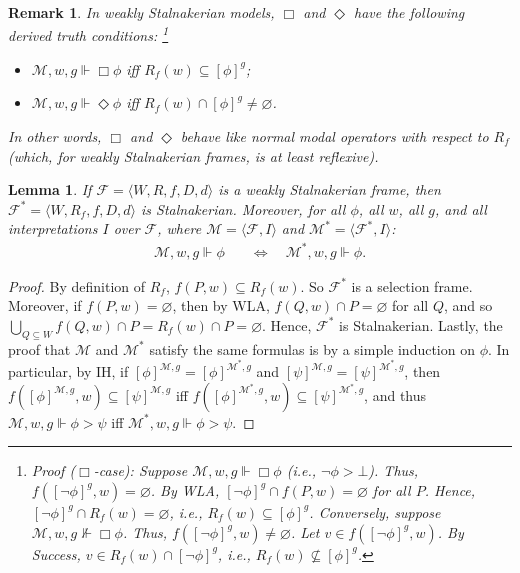 \documentclass[12pt]{article}
\newtheorem{lemma}{Lemma}
\newtheorem{remark}{Remark}
\newcommand{\tup}[1]{\langle #1 \rangle}
\newcommand{\would}{\mathbin{>}}
\newcommand{\nec}{\mathop{\Box}}
\newcommand{\pos}{\mathop{\Diamond}}
\begin{document}
\begin{remark}
    In weakly Stalnakerian models, $\nec$ and $\pos$ have the following derived truth conditions:%
    \footnote{
        \emph{Proof} ($\nec$-case): 
        Suppose $\mathcal{M},w,g \Vdash \nec\phi$ (i.e., $\neg\phi \would \bot$). 
        Thus, $f([\neg\phi]^g,w) = \varnothing$. 
        By WLA, $[\neg\phi]^g \cap f(P,w) = \varnothing$ for all $P$. 
        Hence, $[\neg\phi]^g \cap R_f(w) = \varnothing$, i.e., $R_f(w) \subseteq [\phi]^g$. 
        Conversely, suppose $\mathcal{M},w,g \nVdash \nec\phi$. 
        Thus, $f([\neg\phi]^g,w) \neq \varnothing$. 
        Let $v \in f([\neg\phi]^g,w)$. 
        By Success, $v \in R_f(w) \cap [\neg\phi]^g$, i.e., $R_f(w) \nsubseteq [\phi]^g$. 
        } %
    \begin{itemize}
        \item[$\nec$.] $\mathcal{M},w,g \Vdash \nec\phi$ iff $R_f(w)\subseteq[\phi]^{g}$;
        \item[$\pos$.] $\mathcal{M},w,g \Vdash \pos\phi$ iff $R_f(w)\cap[\phi]^{g}\neq\varnothing$.
    \end{itemize}
    In other words, $\nec$ and $\pos$ behave like normal modal operators with respect to $R_f$ (which, for weakly Stalnakerian frames, is at least reflexive). 
\end{remark}

\begin{lemma}\label{lem:convert}
    If $\mathcal{F} = \tup{W,R,f,D,d}$ is a weakly Stalnakerian frame, then $\mathcal{F}^* = \tup{W,R_f,f,D,d}$ is Stalnakerian. 
    Moreover, for all $\phi$, all $w$, all $g$, and all interpretations $I$ over $\mathcal{F}$, where $\mathcal{M} = \tup{\mathcal{F},I}$ and $\mathcal{M}^* = \tup{\mathcal{F}^*,I}$:
    \begin{align*}
        \mathcal{M},w,g \Vdash \phi & \quad\Leftrightarrow\quad \mathcal{M}^*,w,g \Vdash \phi.
    \end{align*}
\end{lemma}

\begin{proof}
    By definition of $R_f$, $f(P,w) \subseteq R_f(w)$. 
    So $\mathcal{F}^*$ is a selection frame. 
    Moreover, if $f(P,w) = \varnothing$, then by WLA, $f(Q,w) \cap P = \varnothing$ for all $Q$, and so $\bigcup_{Q \subseteq W}f(Q,w) \cap P = R_f(w) \cap P = \varnothing$. 
    Hence, $\mathcal{F}^*$ is Stalnakerian. 
    Lastly, the proof that $\mathcal{M}$ and $\mathcal{M}^*$ satisfy the same formulas is by a simple induction on $\phi$.
    In particular, by IH, if $[\phi]^{\mathcal{M},g} = [\phi]^{\mathcal{M}^*,g}$ and $[\psi]^{\mathcal{M},g} = [\psi]^{\mathcal{M}^*,g}$, then $f([\phi]^{\mathcal{M},g},w) \subseteq [\psi]^{\mathcal{M},g}$ iff $f([\phi]^{\mathcal{M}^*,g},w) \subseteq [\psi]^{\mathcal{M}^*,g}$, and thus $\mathcal{M},w,g \Vdash \phi \would \psi$ iff $\mathcal{M}^*,w,g \Vdash \phi \would \psi$. 
\end{proof}
\end{document}
